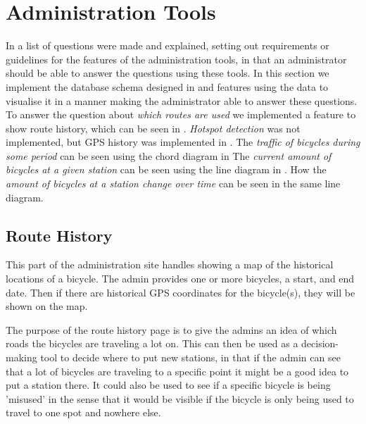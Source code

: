 \section{Administration Tools}\label{sec:impAdminTools}
In  a list of questions were made and explained, setting out requirements or guidelines for the features of the administration tools, in that an administrator should be able to answer the questions using these tools. 
In this section we implement the database schema designed in  and features using the data to visualise it in a manner making the administrator able to answer these questions.
To answer the question about \textit{which routes are used} we implemented a feature to show route history, which can be seen in .
\textit{Hotspot detection} was not implemented, but GPS history was implemented in .
The \textit{traffic of bicycles during some period} can be seen using the chord diagram in 
The \textit{current amount of bicycles at a given station} can be seen using the line diagram in .
How the \textit{amount of bicycles at a station change over time} can be seen in the same line diagram.

\subsection{Route History}\label{sec:routeHistory}
This part of the administration site handles showing a map of the historical locations of a bicycle.
The admin provides one or more bicycles, a start, and end date.
Then if there are historical GPS coordinates for the bicycle(s), they will be shown on the map. 

The purpose of the route history page is to give the admins an idea of which roads the bicycles are traveling a lot on. 
This can then be used as a decision-making tool to decide where to put new stations, in that if the admin can see that a lot of bicycles are traveling to a specific point it might be a good idea to put a station there.
It could also be used to see if a specific bicycle is being 'misused' in the sense that it would be visible if the bicycle is only being used to travel to one spot and nowhere else.

